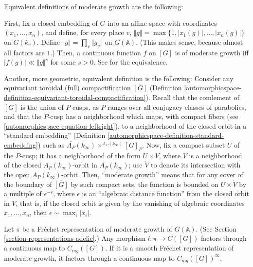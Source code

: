 \begin{remark}
 \label{remark-moderate-growth-definitions}
Equivalent  definitions of moderate growth are the following: 

First, fix a closed embedding of $G$ into an affine space with coordinates $(x_1, \dots, x_n)$, and define, for every place $v$,  $\Vert g\Vert = \max\{1, |x_1(g)|, \dots, |x_n(g)|\}$ on $G(k_v)$. Define $\Vert g\Vert = \prod_v \Vert g_v \Vert $ on $G(\mathbb A)$. (This makes sense, because almost all factors are $1$.) Then, a continuous function $f$ on $[G]$ is of moderate growth iff $|f(g)|\ll \Vert g\Vert^s$ for some $s>0$. See \cite[I.2.2]{MW} for the equivalence.

Another, more geometric, equivalent definition is the following: Consider any equivariant toroidal (full) compactification $\overline{[G]}$ (Definition \ref{automorphicspace-definition-equivariant-toroidal-compactification}). Recall that the comlement of $[G]$ is the union of $P$-cusps, as $P$ ranges over all conjugacy classes of parabolics, and that the $P$-cusp has a neighborhood which maps, with compact fibers (see \eqref{automorphicspace-equation-leftright}), to a neighborhood of the closed orbit in a ``standard embedding'' (Definition \ref{automorphicspace-definition-standard-embedding}) such as $\overline{A_P}(k_\infty) \times^{A_P(k_\infty)} [G]_P$. Now, fix a compact subset $U$ of the $P$-cusp; it has a neighborhood of the form $U\times V$, where $V$ is a neighborhood of the closed $A_P(k_\infty)$-orbit in $\overline{A_P}(k_\infty)$; use $\mathring V$ to denote its intersection with the open $A_P(k_\infty)$-orbit. Then, ``moderate growth'' means that for any cover of the boundary of $\overline{[G]}$ by such compact sets, the function is bounded on $U\times \mathring V$ by a multiple of $\epsilon^{-s}$, where $\epsilon$ is an ``algebraic distance function'' from the closed orbit in $V$, that is, if the closed orbit is given by the vanishing of algebraic coordinates $x_1, \dots, x_n$, then $\epsilon \sim \max_i |x_i|$. 

\end{remark}


\begin{proposition}
 \label{proposition-moderate-growth}
Let $\pi$ be a Fr\'echet representation of moderate growth of $G(\mathbb A)$. (See Section \ref{section-representations-adelic}.) Any morphism $l:\pi\to C([G])$ factors through a continuous map to $C_{mg}([G])$. If it is a smooth Fr\'echet representation of moderate growth, it factors through a continuous map to $C_{mg}([G])^\infty$.
\end{proposition}

